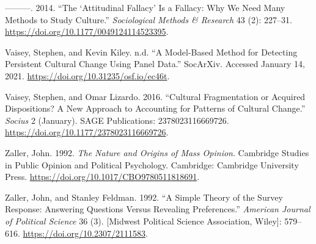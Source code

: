 \documentclass[12pt,]{article}
\begin{document}
\leavevmode\hypertarget{ref-vaisey2014}{}%
---------. 2014. ``The `Attitudinal Fallacy' Is a Fallacy: Why We Need Many Methods to Study Culture.'' \emph{Sociological Methods \& Research} 43 (2): 227--31. \url{https://doi.org/10.1177/0049124114523395}.

\leavevmode\hypertarget{ref-vaisey2020}{}%
Vaisey, Stephen, and Kevin Kiley. n.d. ``A Model-Based Method for Detecting Persistent Cultural Change Using Panel Data.'' SocArXiv. Accessed January 14, 2021. \url{https://doi.org/10.31235/osf.io/ec46t}.

\leavevmode\hypertarget{ref-vaisey2016}{}%
Vaisey, Stephen, and Omar Lizardo. 2016. ``Cultural Fragmentation or Acquired Dispositions? A New Approach to Accounting for Patterns of Cultural Change.'' \emph{Socius} 2 (January). SAGE Publications: 2378023116669726. \url{https://doi.org/10.1177/2378023116669726}.

\leavevmode\hypertarget{ref-zaller1992}{}%
Zaller, John. 1992. \emph{The Nature and Origins of Mass Opinion}. Cambridge Studies in Public Opinion and Political Psychology. Cambridge: Cambridge University Press. \url{https://doi.org/10.1017/CBO9780511818691}.

\leavevmode\hypertarget{ref-zaller1992a}{}%
Zaller, John, and Stanley Feldman. 1992. ``A Simple Theory of the Survey Response: Answering Questions Versus Revealing Preferences.'' \emph{American Journal of Political Science} 36 (3). {[}Midwest Political Science Association, Wiley{]}: 579--616. \url{https://doi.org/10.2307/2111583}.
\end{document}

